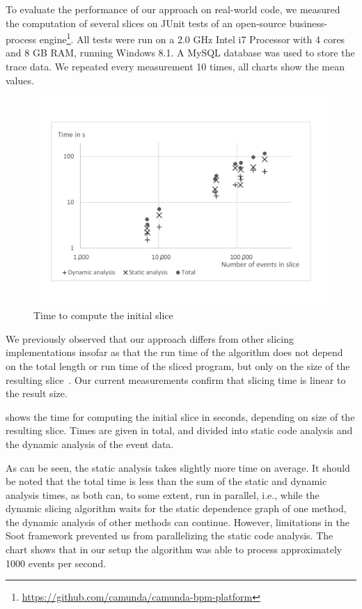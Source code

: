 \documentclass[
			english,
			]{elsarticle}
\begin{document}
To evaluate the performance of our approach on real-world code, we measured the computation of several slices on JUnit tests of an open-source business-process engine\footnote{\url{https://github.com/camunda/camunda-bpm-platform}}.
All tests were run on a 2.0 GHz Intel i7 Processor with 4 cores and 8 GB RAM, running Windows 8.1.
A MySQL database was used to store the trace data.
We repeated every measurement 10 times, all charts show the mean values.

\begin{figure}
	\centering
		\includegraphics[width=\linewidth, clip, trim={20mm 26mm 20mm 26mm}]{chart-initial.pdf}
	\caption{Time to compute the initial slice}
	\label{fig:chartinitial}
\end{figure}

We previously observed that our approach differs from other slicing implementations insofar as that the run time of the algorithm does not depend on the total length or run time of the sliced program, but only on the size of the resulting slice~\cite{treffer_dynamic_2014}.
Our current measurements confirm that slicing time is linear to the result size.

 shows the time for computing the initial slice in seconds, depending on size of the resulting slice.
Times are given in total, and divided into static code analysis and the dynamic analysis of the event data.

As can be seen, the static analysis takes slightly more time on average.
It should be noted that the total time is less than the sum of the static and dynamic analysis times, as both can, to some extent, run in parallel,
i.e., while the dynamic slicing algorithm waits for the static dependence graph of one method, the dynamic analysis of other methods can continue.
However, limitations in the Soot framework prevented us from parallelizing the static code analysis.
The chart shows that in our setup the algorithm was able to process approximately 1000 events per second.
\end{document}
